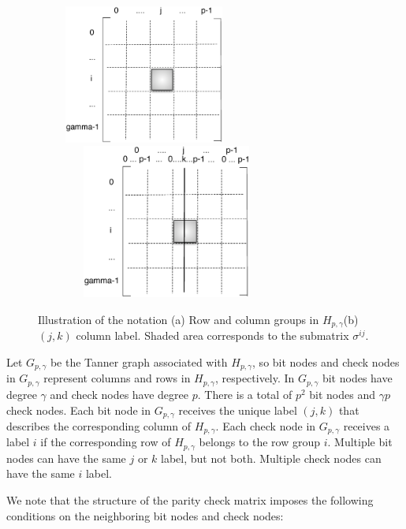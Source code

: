 \begin{figure}
\center\includegraphics[width=2.8in,height=1.8in]{matrix1.eps}
\\
\hspace{0.65in}\includegraphics[width=3.4in,height=2.0in]{matrix2.eps}
\caption{Illustration of the notation (a) Row and column groups in
$H_{p,\gamma}$(b) $(j,k)$ column label. Shaded area corresponds to
the submatrix $\sigma^{ij}$.} \label{fig62}
\end{figure}

Let $G_{p,\gamma}$ be the Tanner graph associated with
$H_{p,\gamma}$, so bit nodes and check nodes in $G_{p,\gamma}$
represent columns and rows in $H_{p,\gamma}$, respectively. In
$G_{p,\gamma}$ bit nodes have degree $\gamma$ and check nodes have
degree $p$. There is a total of $p^2$ bit nodes and $\gamma p$ check
nodes. Each bit node in $G_{p,\gamma}$ receives the unique label
$(j,k)$ that describes the corresponding column of $H_{p,\gamma}$.
Each check node in $G_{p,\gamma}$ receives a label $i$ if
 the corresponding row of $H_{p,\gamma}$ belongs to the row group
$i$. Multiple bit nodes can have the same $j$ or $k$ label, but not
both. Multiple check nodes can have the same $i$ label.

We note that the structure of the parity check matrix imposes the
following conditions on the neighboring bit nodes and check nodes:

